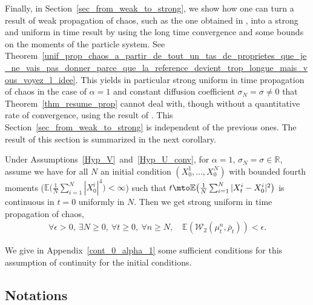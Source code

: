 Finally, in Section~\ref{sec_from_weak_to_strong}, we show how one can turn a result of weak propagation of chaos, such as the one obtained in \cite{Rogers_Shi, cepa_lepingle, Li_Li_Xie}, into a strong and uniform in time result by using the long time convergence and some bounds on the moments of the particle system. See Theorem~\ref{unif_prop_chaos_a_partir_de_tout_un_tas_de_proprietes_que_je_ne_vais_pas_donner_parce_que_la_reference_devient_trop_longue_mais_vous_voyez_l_idee}. This yields in particular strong uniform in time propagation of chaos in the case of $\alpha=1$ and constant diffusion coefficient $\sigma_N=\sigma\neq0$ that Theorem~\ref{thm_resume_prop} cannot deal with, though without a quantitative rate of convergence, using the result of \cite{cepa_lepingle}. This Section~\ref{sec_from_weak_to_strong} is independent of the previous ones. The result of this section is summarized in the next corollary.

\begin{corollary}
Under Assumptions~\ref{Hyp_V}~and~\ref{Hyp_U_conv}, for $\alpha=1$, $\sigma_N= \sigma\in\mathbb{R}$, assume we have for all $N$ an initial condition $(X^1_0,\dots,X^N_0)$ with bounded fourth moments (\ie $\mathbb{E}\bigl(\frac{1}{N}\sum_{i=1}^N|X^i_0|^4\bigr)<\infty$) such that ${t\mto\mathbb{E}\bigl(\frac{1}{N}\sum_{i=1}^N|X^i_t-X^i_0|^2\bigr)}$ is continuous in $t=0$ uniformly in $N$. Then we get strong uniform in time propagation of chaos, \ie
\begin{align*}
\forall \epsilon>0,\ \exists N\geq0,\ \forall t\geq0,\ \forall n\geq N,\quad \mathbb{E}\left(\mathcal{W}_2\left(\mu^n_t,\bar{\rho}_t\right)\right)<\epsilon.
\end{align*}
\end{corollary}

We give in Appendix~\ref{cont_0_alpha_1} some sufficient conditions for this assumption of continuity for the initial conditions.

\subsection*{Notations}

